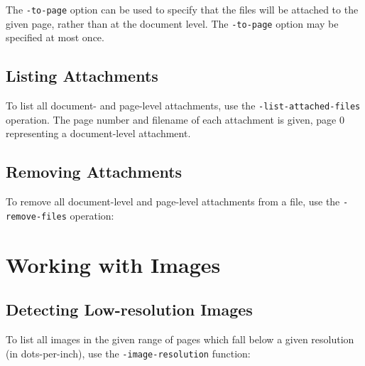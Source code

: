 \documentclass{book}
\begin{document}
  The \texttt{-to-page} option can be used to specify that the files will be attached to the given page, rather than at the document level. The \texttt{-to-page} option may be specified at most once. 


\section{Listing Attachments}
To list all document- and page-level attachments, use the \texttt{-list-attached-files} operation. The page number and filename of each attachment is given, page 0 representing a document-level attachment.

\noindent{}



  \section{Removing Attachments}
   To remove all document-level and page-level attachments from a file, use the \texttt{-remove-files} operation:

\noindent{}


\chapter{Working with Images}

\noindent{}


  \section{Detecting Low-resolution Images}
  To list all images in the given range of pages which fall below a given resolution (in dots-per-inch), use the \verb!-image-resolution! function: 

\noindent{}
\end{document}
